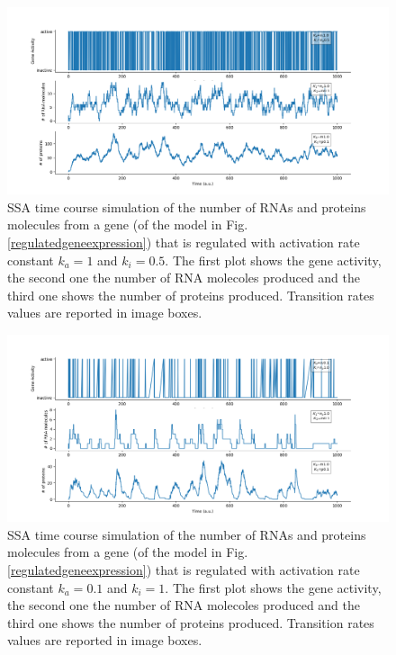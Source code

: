 \documentclass[12pt,a4paper]{report}
\begin{document}
\begin{figure}[!ht]
\hspace*{-2.5cm} 
\includegraphics[scale=0.59]{firstmodelka1ki0.5timeplot.png}
\caption{SSA time course simulation of the number of RNAs and proteins molecules from a gene (of the model in Fig.\ref{regulatedgeneexpression}) that is regulated with activation rate constant $k_{a}=1$ and $k_{i}=0.5$. The first plot shows the gene activity, the second one the number of RNA molecoles produced and the third one shows the number of proteins produced. Transition rates values are reported in image boxes.}
\label{firstmodelka1ki0.5timeplot}
\end{figure}
\newpage
\begin{figure}[!ht]
\hspace*{-2.5cm} 
\includegraphics[scale=0.59]{firstmodelka0.1ki1timeplot.png}
\caption{SSA time course simulation of the number of RNAs and proteins molecules from a gene (of the model in Fig.\ref{regulatedgeneexpression}) that is regulated with activation rate constant $k_{a}=0.1$ and $k_{i}=1$. The first plot shows the gene activity, the second one the number of RNA molecoles produced and the third one shows the number of proteins produced. Transition rates values are reported in image boxes.}
\label{firstmodelka0.1ki1timeplot}
\end{figure}
\end{document}
